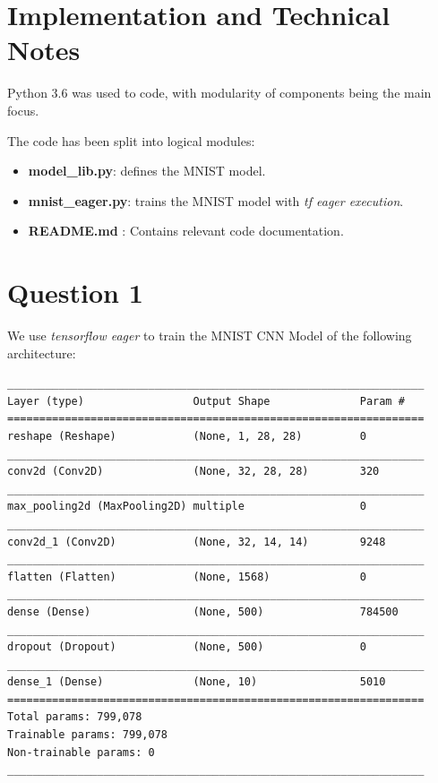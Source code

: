 \section {Implementation and Technical Notes}

Python 3.6 was used to code, with modularity of components being the main focus. 

The code has been split into logical modules:
\begin{itemize}
\item \textbf{model_lib.py}: defines the MNIST model.
\item \textbf{mnist_eager.py}: trains the MNIST model with \textit{tf eager execution}.
\item  \textbf{README.md }: Contains relevant code documentation.
\end{itemize}


\section {Question 1}

We use \textit{tensorflow eager} to train the MNIST CNN Model of the following architecture:

\begin{lstlisting}
_________________________________________________________________
Layer (type)                 Output Shape              Param #   
=================================================================
reshape (Reshape)            (None, 1, 28, 28)         0         
_________________________________________________________________
conv2d (Conv2D)              (None, 32, 28, 28)        320       
_________________________________________________________________
max_pooling2d (MaxPooling2D) multiple                  0         
_________________________________________________________________
conv2d_1 (Conv2D)            (None, 32, 14, 14)        9248      
_________________________________________________________________
flatten (Flatten)            (None, 1568)              0         
_________________________________________________________________
dense (Dense)                (None, 500)               784500    
_________________________________________________________________
dropout (Dropout)            (None, 500)               0         
_________________________________________________________________
dense_1 (Dense)              (None, 10)                5010      
=================================================================
Total params: 799,078
Trainable params: 799,078
Non-trainable params: 0
_________________________________________________________________
\end{lstlisting}

